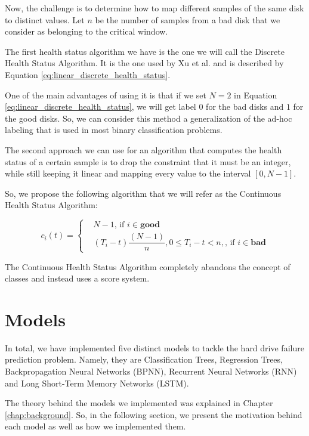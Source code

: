 Now, the challenge is to determine how to map different samples of the same disk to distinct values.
Let $n$ be the number of samples from a bad disk that we consider as belonging to the critical window.

The first health status algorithm we have is the one we will call the Discrete Health Status Algorithm.
It is the one used by Xu et al. \cite{Xu16} and is described by Equation \ref{eq:linear_discrete_health_status}.

One of the main advantages of using it is that if we set $N = 2$ in Equation \ref{eq:linear_discrete_health_status}, we will get label $0$ for the bad disks and $1$ for the good disks.
So, we can consider this method a generalization of the ad-hoc labeling that is used in most binary classification problems.

The second approach we can use for an algorithm that computes the health status of a certain sample is to drop the constraint that it must be an integer, while still keeping it linear and mapping every value to the interval $[0,N-1]$.

So, we propose the following algorithm that we will refer as the Continuous Health Status Algorithm:

\begin{equation}\label{eq:continuous_health_status}
  c_i(t) = 
  \begin{cases}
    & N - 1 \text{, if } i \in \mathbf{good} \\
    & (T_i-t)\dfrac{(N-1)}{n}, 0 \leq T_i - t < n, \text{, if } i \in \mathbf{bad}
  \end{cases}
\end{equation}

The Continuous Health Status Algorithm completely abandons the concept of classes and instead uses a score system.

\section{Models}\label{sec:models}

In total, we have implemented five distinct models to tackle the hard drive failure prediction problem.
Namely, they are Classification Trees, Regression Trees, Backpropagation Neural Networks (BPNN), Recurrent Neural Networks (RNN) and Long Short-Term Memory Networks (LSTM).

The theory behind the models we implemented was explained in Chapter \ref{chap:background}. 
So, in the following section, we present the motivation behind each model as well as how we implemented them.

